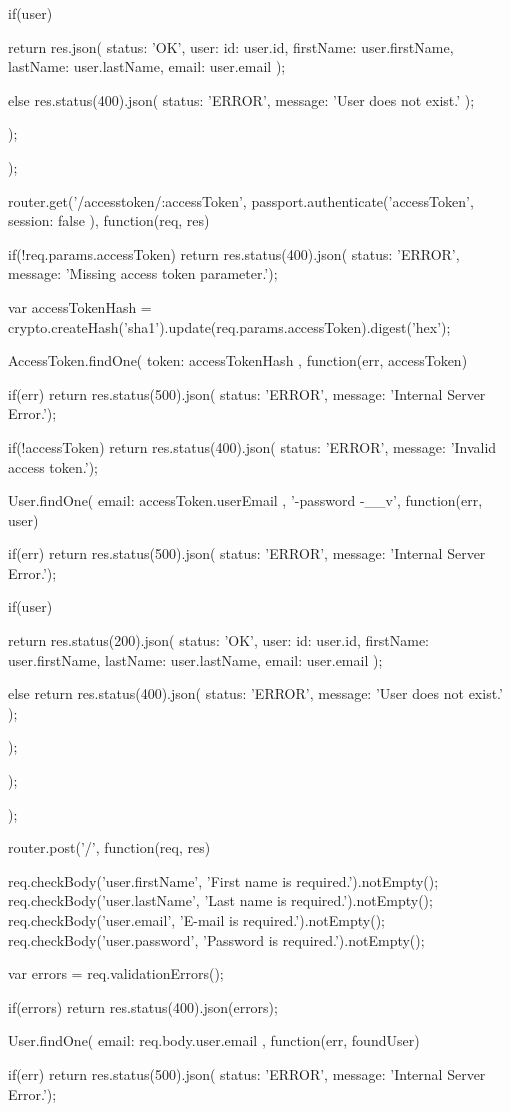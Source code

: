 \begin{flushleft}
{{		if(user) {
			return res.json({
				status: 'OK',
				user: {
					id: user.id,
					firstName: user.firstName,
					lastName: user.lastName,
					email: user.email
				}
			});
			
		} else {
		res.status(400).json({ status: 'ERROR', message: 'User does not exist.' });
	}
	
});

});

router.get('/accesstoken/:accessToken', passport.authenticate('accessToken', { session: false }), function(req, res) {
	if(!req.params.accessToken)
	return res.status(400).json({ status: 'ERROR', message: 'Missing access token parameter.'});
	
	var accessTokenHash = crypto.createHash('sha1').update(req.params.accessToken).digest('hex');
	
	AccessToken.findOne({ token: accessTokenHash }, function(err, accessToken) {
		if(err)
		return res.status(500).json({ status: 'ERROR', message: 'Internal Server Error.'});
		
		if(!accessToken)
		return res.status(400).json({ status: 'ERROR', message: 'Invalid access token.'});
		
		User.findOne({ email: accessToken.userEmail }, '-password -\_\_v', function(err, user) {
			if(err)
			return res.status(500).json({ status: 'ERROR', message: 'Internal Server Error.'});
			
			if(user) {
				return res.status(200).json({
					status: 'OK',
					user: {
						id: user.id,
						firstName: user.firstName,
						lastName: user.lastName,
						email: user.email
					}
				});
				
			} else {
			return res.status(400).json({ status: 'ERROR', message: 'User does not exist.' });
		}
		
	});
	
});

});

router.post('/', function(req, res) {
	req.checkBody('user.firstName', 'First name is required.').notEmpty();
	req.checkBody('user.lastName', 'Last name is required.').notEmpty();
	req.checkBody('user.email', 'E-mail is required.').notEmpty();
	req.checkBody('user.password', 'Password is required.').notEmpty();
	
	var errors = req.validationErrors();
	
	if(errors)
	return res.status(400).json(errors);
	
	User.findOne({ email: req.body.user.email }, function(err, foundUser) {
		if(err) {
			return res.status(500).json({ status: 'ERROR', message: 'Internal Server Error.'});
		}
		
}}
\end{flushleft}
